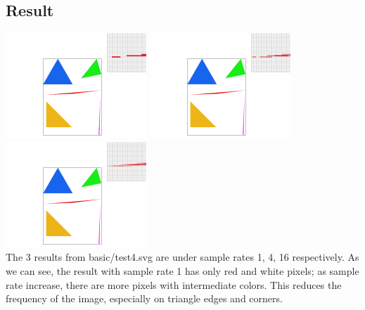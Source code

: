 \documentclass[11pt]{article}
\begin{document}
\subsection{Result}
\includegraphics[width=150pt]{screenshot_2-15_3-21-33.png}
\includegraphics[width=150pt]{screenshot_2-15_3-21-41.png}
\includegraphics[width=150pt]{screenshot_2-15_3-21-51.png}
\\The 3 results from basic/test4.svg are under sample rates 1, 4, 16 respectively. As we can see, the result with sample rate 1 has only red and white pixels; as sample rate increase, there are more pixels with intermediate colors. This reduces the frequency of the image, especially on triangle edges and corners.

\newpage
\end{document}
